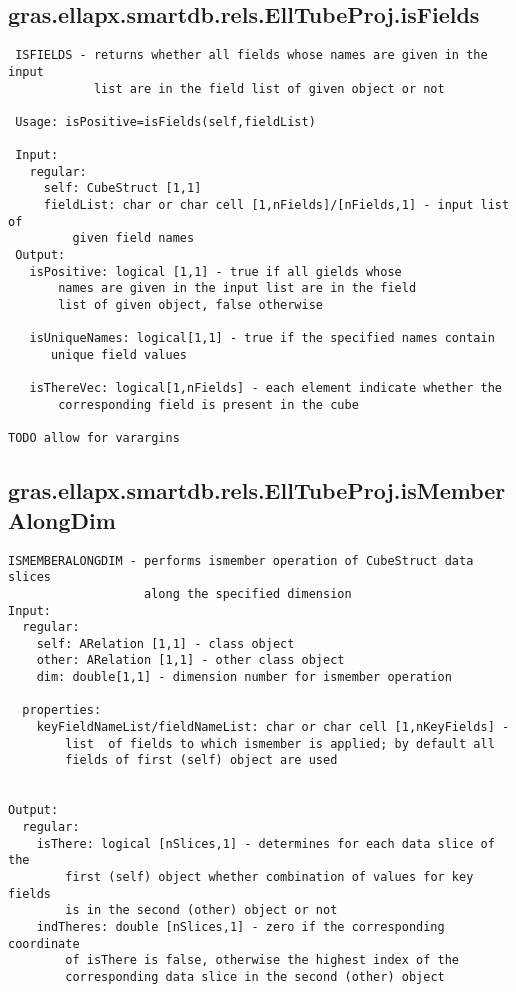 \subsection{\texorpdfstring{gras.ellapx.smartdb.rels.EllTubeProj.isFields}{isFields}}\label{method:gras.ellapx.smartdb.rels.EllTubeProj.isFields}
\begin{verbatim}
 ISFIELDS - returns whether all fields whose names are given in the input
            list are in the field list of given object or not

 Usage: isPositive=isFields(self,fieldList)

 Input:
   regular:
     self: CubeStruct [1,1]
     fieldList: char or char cell [1,nFields]/[nFields,1] - input list of
         given field names
 Output:
   isPositive: logical [1,1] - true if all gields whose
       names are given in the input list are in the field
       list of given object, false otherwise

   isUniqueNames: logical[1,1] - true if the specified names contain
      unique field values

   isThereVec: logical[1,nFields] - each element indicate whether the
       corresponding field is present in the cube

TODO allow for varargins
\end{verbatim}
\subsection{\texorpdfstring{gras.ellapx.smartdb.rels.EllTubeProj.isMemberAlongDim}{isMemberAlongDim}}\label{method:gras.ellapx.smartdb.rels.EllTubeProj.isMemberAlongDim}
\begin{verbatim}
ISMEMBERALONGDIM - performs ismember operation of CubeStruct data slices
                   along the specified dimension
Input:
  regular:
    self: ARelation [1,1] - class object
    other: ARelation [1,1] - other class object
    dim: double[1,1] - dimension number for ismember operation

  properties:
    keyFieldNameList/fieldNameList: char or char cell [1,nKeyFields] -
        list  of fields to which ismember is applied; by default all
        fields of first (self) object are used


Output:
  regular:
    isThere: logical [nSlices,1] - determines for each data slice of the
        first (self) object whether combination of values for key fields
        is in the second (other) object or not
    indTheres: double [nSlices,1] - zero if the corresponding coordinate
        of isThere is false, otherwise the highest index of the
        corresponding data slice in the second (other) object
\end{verbatim}
